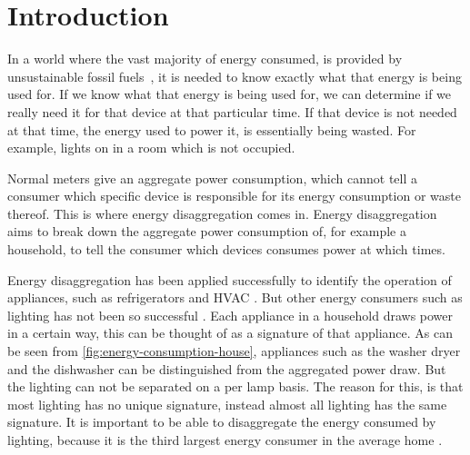 
\chapter{Introduction}
\label{chp:introduction}

\vspace{1\baselineskip}

\noindent


In a world where the vast majority of energy consumed, is provided by unsustainable fossil fuels~\cite{kolter2011redd}, it is needed to know exactly what that energy is being used for. 
If we know what that energy is being used for, we can determine if we really need it for that device at that particular time.
If that device is not needed at that time, the energy used to power it, is essentially being wasted.
For example, lights on in a room which is not occupied.



Normal meters give an aggregate power consumption, which cannot tell a consumer which specific device is responsible for its energy consumption or waste thereof.
This is where energy disaggregation comes in.
Energy disaggregation aims to break down the aggregate power consumption of, for example a household, to tell the consumer which devices consumes power at which times.




Energy disaggregation has been applied successfully to identify the operation of appliances, such as refrigerators and HVAC \cite{kolter2011redd} \cite{spiegel2014energy}.
But other energy consumers such as lighting has not been so successful \cite{spiegel2014energy} \cite{batra2015neighbourhood}.
Each appliance in a household draws power in a certain way, this can be thought of as a signature of that appliance.
As can be seen from \autoref{fig:energy-consumption-house}, appliances such as the washer dryer and the dishwasher can be distinguished from the aggregated power draw.
But the lighting can not be separated on a per lamp basis.
The reason for this, is that most lighting has no unique signature, instead almost all lighting has the same signature.
It is important to be able to disaggregate the energy consumed by lighting, because it is the third largest energy consumer in the average home \cite{batra2015neighbourhood}.

